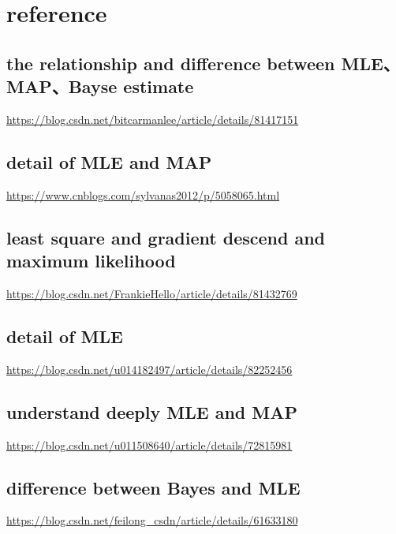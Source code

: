\documentclass[12pt]{ctexart}%
\begin{document}
	
		
	\section{\quad reference}
		\subsection{\quad the relationship and difference between MLE、MAP、Bayse estimate}
			\url{https://blog.csdn.net/bitcarmanlee/article/details/81417151}
			
		\subsection{\quad detail of MLE and MAP}
			\url{https://www.cnblogs.com/sylvanas2012/p/5058065.html}
			
		\subsection{\quad least square and gradient descend and maximum likelihood}
			\url{https://blog.csdn.net/FrankieHello/article/details/81432769}
			
		\subsection{\quad detail of MLE}
			\url{https://blog.csdn.net/u014182497/article/details/82252456}
			
		\subsection{\quad understand deeply MLE and MAP}
			\url{https://blog.csdn.net/u011508640/article/details/72815981}
		
		\subsection{\quad difference between Bayes and MLE}
		\url{https://blog.csdn.net/feilong_csdn/article/details/61633180}
\end{document}
